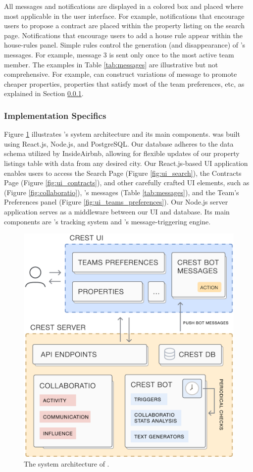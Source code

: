 All \cbot messages and notifications are displayed in a colored box and placed where most applicable in the user interface. For example, notifications that encourage users to propose a contract are placed within the property listing on the search page. Notifications that encourage users to add a house rule appear within the house-rules panel. Simple rules control the generation (and disappearance) of \cbot's messages. For example, message 3 is sent only once to the most active team member. The examples in Table \ref{tab:messages} are illustrative but not comprehensive. For example, \cbot can construct variations of message \label{msg:highestrated} to promote cheaper properties, properties that satisfy most of the team preferences, etc, as explained in Section \ref{sssection:implementation}.

\subsubsection{Implementation Specifics}
\label{sssection:implementation}

Figure \ref{fig:crest-architecture} illustrates \tool's system architecture and its main components. \tool was built using React.js, Node.js, and PostgreSQL.
Our database adheres to the data schema utilized by InsideAirbnb\cite{insideairbnb}, allowing for flexible updates of our property listings table with data from any desired city. Our React.js-based UI application enables users to access the Search Page (Figure \ref{fig:ui_search}), the Contracts Page (Figure \ref{fig:ui_contracts}), and other carefully crafted UI elements, such as \collaboRatio (Figure \ref{fig:collaboratio}), \cbot's messages (Table \ref{tab:messages}), and the Team's Preferences panel (Figure \ref{fig:ui_teams_preferences}). Our Node.js server application serves as a middleware between our UI and database. Its main components are
\collaboRatio's tracking system and \cbot's message-triggering engine.
\begin{figure}
    \includegraphics[width=0.55\linewidth]{images/crest-architecture.pdf}
    \caption{The system architecture of \tool.}
    \label{fig:crest-architecture}
\end{figure}


